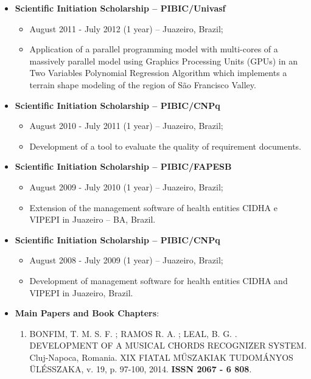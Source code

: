 \documentclass[10pt]{article}
\begin{document}
\begin{itemize}\item \textbf{Scientific Initiation Scholarship -- PIBIC/Univasf}
	\begin{itemize}
		\item August 2011 - July 2012 (1 year) -- Juazeiro, Brazil;
		\item Application of a parallel programming model with multi-cores of a massively parallel model using Graphics Processing Units (GPUs) in an Two Variables Polynomial Regression Algorithm which implements a terrain shape modeling of the region of São Francisco Valley.
	\end{itemize}

	\item \textbf{Scientific Initiation Scholarship -- PIBIC/CNPq}
	\begin{itemize}
		\item August 2010 - July 2011 (1 year) -- Juazeiro, Brazil;
		\item Development of a tool to evaluate the quality of requirement documents.
	\end{itemize}

	\item \textbf{Scientific Initiation Scholarship -- PIBIC/FAPESB}
	\begin{itemize}
		\item August 2009 - July 2010 (1 year) -- Juazeiro, Brazil;
		\item Extension of the management software of health entities CIDHA e VIPEPI in Juazeiro -- BA, Brazil.
	\end{itemize}

	\item \textbf{Scientific Initiation Scholarship -- PIBIC/CNPq}
	\begin{itemize}
		\item August 2008 - July 2009 (1 year) -- Juazeiro, Brazil;
		\item Development of management software for health entities CIDHA and VIPEPI in Juazeiro, Brazil.
	\end{itemize}

	\item \textbf{Main Papers and Book Chapters}:

	\begin{enumerate}
		
		\item BONFIM, T. M. S. F. ; RAMOS R. A. ; LEAL, B. G. . DEVELOPMENT OF A MUSICAL CHORDS RECOGNIZER SYSTEM. Cluj-Napoca, Romania. XIX FIATAL M\H{U}SZAKIAK TUDOMÁNYOS \"{U}LÉSSZAKA, v. 19, p. 97-100, 2014. \textbf{ISSN 2067 - 6 808}.


\end{enumerate}
\end{itemize}
\end{document}
